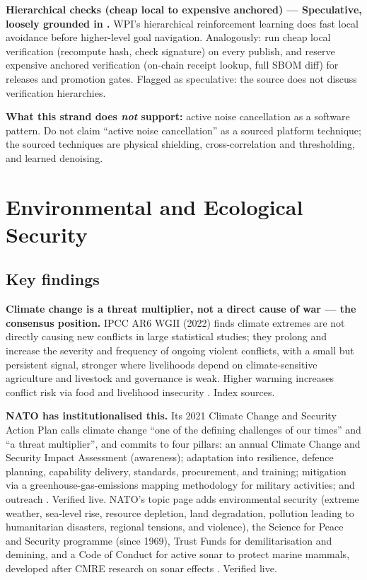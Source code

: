\documentclass[11pt]{article}
\begin{document}
\textbf{Hierarchical checks (cheap local to expensive anchored) ---
Speculative, loosely grounded in \cite{wpi2025}.} WPI's hierarchical
reinforcement learning does fast local avoidance before higher-level
goal navigation. Analogously: run cheap local verification (recompute
hash, check signature) on every publish, and reserve expensive anchored
verification (on-chain receipt lookup, full SBOM diff) for
releases and promotion gates. Flagged as speculative: the source does
not discuss verification hierarchies.

\textbf{What this strand does \emph{not} support:} active noise
cancellation as a software pattern. Do not claim ``active noise
cancellation'' as a sourced platform technique; the sourced techniques
are physical shielding, cross-correlation and thresholding, and learned
denoising.

\section{Environmental and Ecological Security}
\label{sec:ecological}

\subsection{Key findings}

\textbf{Climate change is a threat multiplier, not a direct cause of
war --- the consensus position.} IPCC AR6 WGII (2022) finds climate
extremes are not directly causing new conflicts in large statistical
studies; they prolong and increase the severity and frequency of ongoing
violent conflicts, with a small but persistent signal, stronger where
livelihoods depend on climate-sensitive agriculture and livestock and
governance is weak. Higher warming increases conflict risk via food and
livelihood insecurity \cite{ipcc2022,newsecuritybeat}. Index sources.

\textbf{NATO has institutionalised this.} Its 2021 Climate Change and
Security Action Plan calls climate change ``one of the defining
challenges of our times'' and ``a threat multiplier'', and commits to
four pillars: an annual Climate Change and Security Impact Assessment
(awareness); adaptation into resilience, defence planning, capability
delivery, standards, procurement, and training; mitigation via a
greenhouse-gas-emissions mapping methodology for military activities;
and outreach \cite{nato2021}. Verified live. NATO's topic page adds
environmental security (extreme weather, sea-level rise, resource
depletion, land degradation, pollution leading to humanitarian disasters,
regional tensions, and violence), the Science for Peace and Security
programme (since 1969), Trust Funds for demilitarisation and demining,
and a Code of Conduct for active sonar to protect marine mammals,
developed after CMRE research on sonar effects \cite{nato-topic}.
Verified live.
\end{document}
